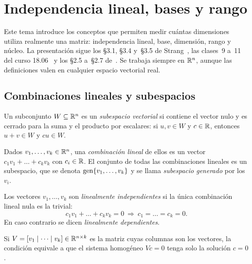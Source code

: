 \chapter{Independencia lineal, bases y rango}
\label{tema:1}

Este tema introduce los conceptos que permiten medir cuántas dimensiones utiliza realmente una matriz: independencia lineal, base, dimensión, rango y núcleo. La presentación sigue los §3.1, §3.4 y~§3.5 de Strang~\cite{strang-ila}, las clases~9 a~11 del curso 18.06~\cite{mit1806} y los §2.5 a~§2.7 de~\cite{mml}. Se trabaja siempre en $\mathbb{R}^{n}$, aunque las definiciones valen en cualquier espacio vectorial real.

\section{Combinaciones lineales y subespacios}

\begin{definicion}[Subespacio]
Un subconjunto $W\subseteq\mathbb{R}^{n}$ es un \emph{subespacio vectorial} si contiene el vector nulo y es cerrado para la suma y el producto por escalares: si $u,v\in W$ y $c\in\mathbb{R}$, entonces $u+v\in W$ y $cu\in W$.
\end{definicion}

\begin{definicion}
Dados $v_1,\dots,v_k\in\mathbb{R}^{n}$, una \emph{combinación lineal} de ellos es un vector $c_1v_1+\dots+c_kv_k$ con $c_i\in\mathbb{R}$. El conjunto de todas las combinaciones lineales es un subespacio, que se denota $\operatorname{gen}\{v_1,\dots,v_k\}$ y se llama \emph{subespacio generado} por los $v_i$.
\end{definicion}

\begin{definicion}\label{def:indep}
Los vectores $v_1,\dots,v_k$ son \emph{linealmente independientes} si la única combinación lineal nula es la trivial:
\[
c_1v_1+\dots+c_kv_k=0\ \Longrightarrow\ c_1=\dots=c_k=0.
\]
En caso contrario se dicen \emph{linealmente dependientes}.
\end{definicion}

Si $V=[v_1\mid\cdots\mid v_k]\in\mathbb{R}^{n\times k}$ es la matriz cuyas columnas son los vectores, la condición equivale a que el sistema homogéneo $Vc=0$ tenga solo la solución $c=0$.

